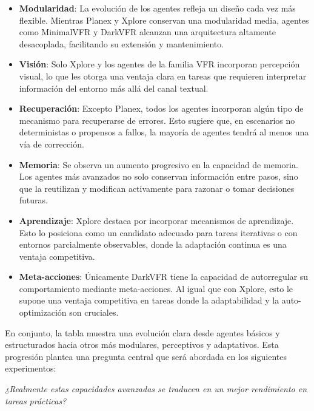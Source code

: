 \begin{itemize}
    \item \textbf{Modularidad}: La evolución de los agentes refleja
    un diseño cada vez más flexible. Mientras Planex y Xplore conservan una
    modularidad media, agentes como MinimalVFR y DarkVFR alcanzan una arquitectura
    altamente desacoplada, facilitando su extensión y mantenimiento.

    \item \textbf{Visión}: Solo Xplore y los agentes de la familia VFR incorporan
    percepción visual, lo que les otorga una ventaja clara en tareas que requieren
    interpretar información del entorno más allá del canal textual.

    \item \textbf{Recuperación}: Excepto Planex, todos los agentes incorporan algún
    tipo de mecanismo para recuperarse de errores. Esto sugiere que, en escenarios
    no deterministas o propensos a fallos, la mayoría de agentes tendrá al menos una
    vía de corrección.

    \item \textbf{Memoria}: Se observa un aumento progresivo en la capacidad de
    memoria. Los agentes más avanzados no solo conservan información entre pasos,
    sino que la reutilizan y modifican activamente para razonar o tomar decisiones futuras.

    \item \textbf{Aprendizaje}: Xplore destaca por incorporar mecanismos
    de aprendizaje. Esto lo posiciona como un candidato adecuado para tareas
    iterativas o con entornos parcialmente observables, donde la adaptación continua
    es una ventaja competitiva.

    \item \textbf{Meta-acciones}: Únicamente DarkVFR tiene la
    capacidad de autorregular su comportamiento mediante meta-acciones.
    Al igual que con Xplore, esto le supone una ventaja competitiva en
    tareas donde la adaptabilidad y la auto-optimización son
    cruciales.
\end{itemize}

En conjunto, la tabla muestra una evolución clara desde agentes básicos y
estructurados hacia otros más modulares, perceptivos y adaptativos. Esta
progresión plantea una pregunta central que será abordada en los siguientes
experimentos:

\emph{¿Realmente estas capacidades avanzadas se traducen en un mejor
rendimiento en tareas prácticas?}

